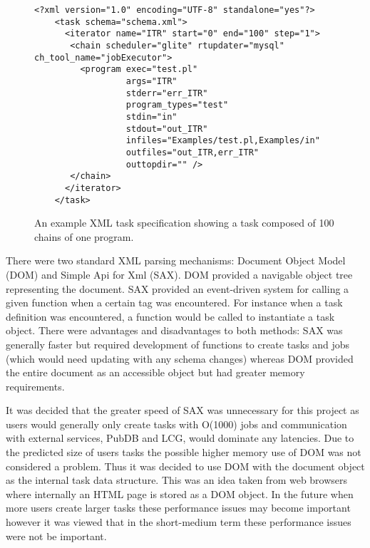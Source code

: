 \begin{figure}[!tp]
\begin{verbatim}
<?xml version="1.0" encoding="UTF-8" standalone="yes"?>
	<task schema="schema.xml">
	  <iterator name="ITR" start="0" end="100" step="1">
	   <chain scheduler="glite" rtupdater="mysql" ch_tool_name="jobExecutor">
	     <program exec="test.pl" 
	              args="ITR" 
	              stderr="err_ITR"
	              program_types="test"
	              stdin="in"
	              stdout="out_ITR"  
	              infiles="Examples/test.pl,Examples/in"
	              outfiles="out_ITR,err_ITR"
	              outtopdir="" /> 
	   </chain>
	  </iterator>
	</task>
\end{verbatim}
\caption{An example XML task specification showing a task composed of 100 chains of one program.~\cite{citeulike:880984}\label{fig:boss_xml}}
\end{figure}
There were two standard XML parsing mechanisms: Document Object Model (DOM) and Simple Api for Xml (SAX). DOM provided a navigable object tree representing the document. SAX provided an event-driven system for calling a given function when a certain tag was encountered. For instance when a task definition was encountered, a function would be called to instantiate a task object. There were advantages and disadvantages to both methods: SAX was generally faster but required development of functions to create tasks and jobs (which would need updating with any schema changes) whereas DOM provided the entire document as an accessible object but had greater memory requirements. 

It was decided that the greater speed of SAX was unnecessary for this project as users would generally only create tasks with O(1000) jobs and communication with external services, PubDB and LCG, would dominate any latencies. Due to the predicted size of users tasks the possible higher memory use of DOM was not considered a problem. Thus it was decided to use DOM with the document object as the internal task data structure. This was an idea taken from web browsers where internally an HTML page is stored as a DOM object. In the future when more users create larger tasks these performance issues may become important however it was viewed that in the short-medium term these performance issues were not be important.

